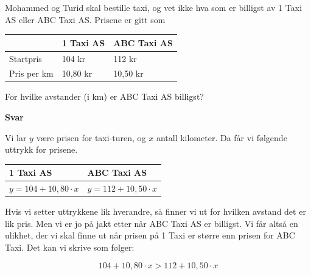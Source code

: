 \documentclass[
  letterpaper,
  DIV=11,
  numbers=noendperiod]{scrartcl}
\theoremstyle{definition}
\theoremstyle{definition}
\theoremstyle{remark}
\begin{document}
\begin{tcolorbox}[enhanced jigsaw, colframe=quarto-callout-caution-color-frame, title={Eksempel}, left=2mm, bottomtitle=1mm, coltitle=black, toprule=.15mm, leftrule=.75mm, opacityback=0, rightrule=.15mm, opacitybacktitle=0.6, breakable, toptitle=1mm, titlerule=0mm, arc=.35mm, bottomrule=.15mm, colbacktitle=quarto-callout-caution-color!10!white, colback=white]

Mohammed og Turid skal bestille taxi, og vet ikke hva som er billigst av
1 Taxi AS eller ABC Taxi AS. Prisene er gitt som

\begin{longtable}[]{@{}lll@{}}
\toprule\noalign{}
& 1 Taxi AS & ABC Taxi AS \\
\midrule\noalign{}
\endhead
\bottomrule\noalign{}
\endlastfoot
Startpris & 104 kr & 112 kr \\
Pris per km & 10,80 kr & 10,50 kr \\
\end{longtable}

For hvilke avstander (i km) er ABC Taxi AS billigst?

\end{tcolorbox}

\begin{tcolorbox}[enhanced jigsaw, colframe=quarto-callout-caution-color-frame, left=2mm, arc=.35mm, breakable, rightrule=.15mm, toprule=.15mm, leftrule=.75mm, opacityback=0, colback=white, bottomrule=.15mm]

\textbf{Svar}\vspace{2mm}

Vi lar \(y\) være prisen for taxi-turen, og \(x\) antall kilometer. Da
får vi følgende uttrykk for prisene.

\begin{longtable}[]{@{}ll@{}}
\toprule\noalign{}
1 Taxi AS & ABC Taxi AS \\
\midrule\noalign{}
\endhead
\bottomrule\noalign{}
\endlastfoot
\(y = 104 + 10,80\cdot x\) & \(y = 112 + 10,50\cdot x\) \\
\end{longtable}

Hvis vi setter uttrykkene lik hverandre, så finner vi ut for hvilken
avstand det er lik pris. Men vi er jo på jakt etter når ABC Taxi AS er
billigst. Vi får altså en ulikhet, der vi skal finne ut når prisen på 1
Taxi er større enn prisen for ABC Taxi. Det kan vi skrive som følger:

\[ 104 + 10,80\cdot x > 112 + 10,50\cdot x\]

\end{tcolorbox}
\end{document}
